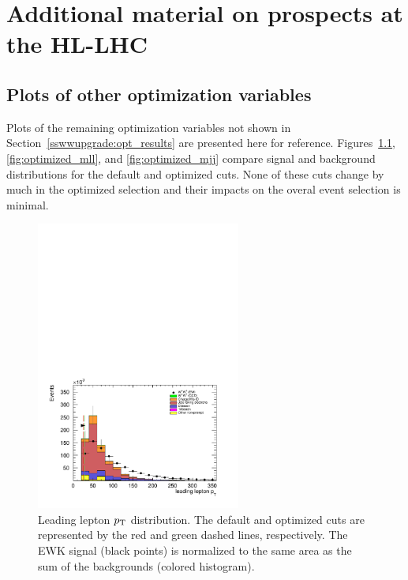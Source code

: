 \chapter{Additional material on \ssww prospects at the HL-LHC}\label{app:sswwupgrade_additional_material}


\FloatBarrier

\section{Plots of other optimization variables}\label{app:sswwupgrade_optimization_plots}
Plots of the remaining optimization variables not shown in Section~\ref{sswwupgrade:opt_results} are presented here for reference.
Figures~\ref{fig:optimized_lep0pt}, \ref{fig:optimized_mll}, and \ref{fig:optimized_mjj} compare signal and background distributions for the default and optimized cuts.
None of these cuts change by much in the optimized selection and their impacts on the overal event selection is minimal.

\begin{figure}[htp]
  \centering
  \includegraphics[width=0.6\textwidth]{figs/ssww_upgrade/optimization_plots/lep0pt}
  \caption{Leading lepton $p_{\mathrm{T}}$ distribution.  The default and optimized cuts are represented by the red and green dashed lines, respectively.  The \ssww EWK signal (black points) is normalized to the same area as the sum of the backgrounds (colored histogram).}
  \label{fig:optimized_lep0pt}
\end{figure}

